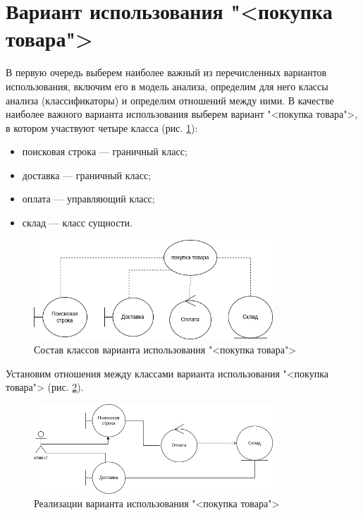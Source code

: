\section{Вариант использования "<покупка товара">}
В первую очередь выберем наиболее важный из перечисленных
вариантов использования, включим его в модель анализа, определим для него
классы анализа (классификаторы) и определим отношений между ними.
В качестве наиболее важного варианта использования выберем вариант
"<покупка товара">, в котором участвуют четыре класса (рис. \ref{fig:buy}):
\begin{itemize}
	\item поисковая строка --- граничный класс;
	\item доставка --- граничный класс;
	\item оплата --- управляющий класс;
	\item склад --- класс сущности.
\end{itemize}
\begin{figure}[h!tp]
	\centering
	\includegraphics[width=0.8\textwidth]{uml_buy}
	\caption{Состав классов варианта использования "<покупка товара">}
	\label{fig:buy}
\end{figure}

Установим отношения между классами варианта использования
"<покупка товара"> (рис. \ref{fig:buy:impl}).
\begin{figure}[h!tp]
	\centering
	\includegraphics[width=0.8\textwidth]{uml_buy_impl}
	\caption{Реализации варианта использования "<покупка товара">}
	\label{fig:buy:impl}
\end{figure}

